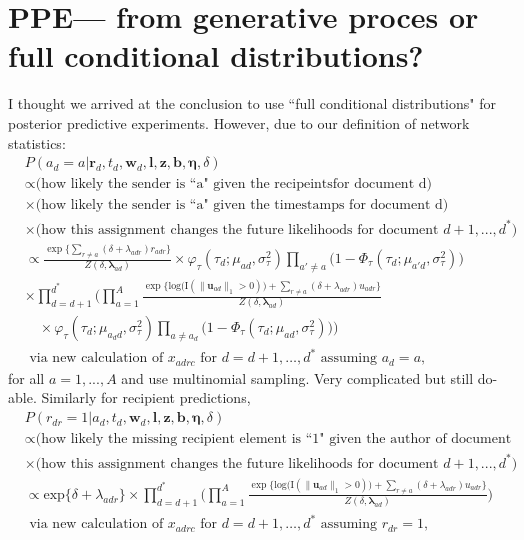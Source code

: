 \documentclass[12pt,a4paper]{article}
\begin{document}
\section{PPE--- from generative proces or full conditional distributions?}
I thought we arrived at the conclusion to use ``full conditional distributions" for posterior predictive experiments. However, due to our definition of network statistics:
\begin{equation}
\begin{aligned}
&P(a_d = a|\boldsymbol{r}_d, t_d, \boldsymbol{w}_d, \boldsymbol{l}, \boldsymbol{z}, \boldsymbol{b}, \boldsymbol{\eta},\delta)\\& \propto \mbox{(how likely the sender is ``a" given the recipeintsfor document d)} \\&\times \mbox{(how likely the sender is ``a" given the timestamps for document d)} \\&\times \mbox{(how this assignment changes the future likelihoods for document }   d+1,...,d^*) 
\\&  \propto \frac{\exp\Big\{\sum\limits_{r \neq a} (\delta+\lambda_{adr})r_{adr}\Big\}}{Z(\delta,\boldsymbol{\lambda}_{ad})}\times\varphi_{\tau}(\tau_{d}; \mu_{ad}, \sigma_\tau^2) \prod
\limits_{a'\neq a}\big(1-\Phi_{\tau}(\tau_{d}; \mu_{a' d}, \sigma_\tau^2) \big)\\& \times
\prod_{d=d+1}^{d^*}\Big(
\prod_{a=1}^A \frac{\exp\Big\{\mbox{log}\big(\text{I}( \lVert \boldsymbol{u}_{ad}\rVert_1 > 0)\big) + \sum\limits_{r \neq a} (\delta+\lambda_{adr})u_{adr}\Big\}}{Z(\delta,\boldsymbol{\lambda}_{ad})}
\\&\quad\times\varphi_{\tau}(\tau_{d}; \mu_{a_d d}, \sigma_\tau^2) \prod_{a\neq a_d}\big(1-\Phi_{\tau}(\tau_{d}; \mu_{a d}, \sigma_\tau^2) \big)\Big)\\& \mbox{ via new calculation of $x_{adrc}$ for $d=d+1,\ldots, d^*$ assuming $a_d=a$},
\end{aligned}
\end{equation}
for all $a=1,...,A$ and use multinomial sampling. Very complicated but still do-able. Similarly for recipient predictions,
\begin{equation}
\begin{aligned}
&P(r_{dr} = 1|a_d, t_d, \boldsymbol{w}_d, \boldsymbol{l}, \boldsymbol{z}, \boldsymbol{b}, \boldsymbol{\eta},\delta)\\& \propto \mbox{(how likely the missing recipient element is ``1" given the author of document d)} \\&\times \mbox{(how this assignment changes the future likelihoods for document }   d+1,...,d^*) 
\\&  \propto \mbox{exp}\{\delta+\lambda_{adr}\} \times
\prod_{d=d+1}^{d^*}\Big(
\prod_{a=1}^A \frac{\exp\Big\{\mbox{log}\big(\text{I}( \lVert \boldsymbol{u}_{ad}\rVert_1 > 0)\big) + \sum\limits_{r \neq a} (\delta+\lambda_{adr})u_{adr}\Big\}}{Z(\delta,\boldsymbol{\lambda}_{ad})}\Big)\\& \mbox{ via new calculation of $x_{adrc}$ for $d=d+1,\ldots, d^*$ assuming $r_{dr}=1$},
\end{aligned}
\end{equation}
\end{document}
